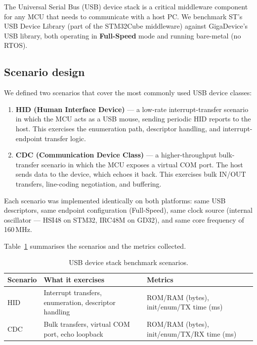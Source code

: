 The Universal Serial Bus (USB) device stack is a critical middleware component for any MCU
that needs to communicate with a host PC. We benchmark ST's USB Device Library (part of the
STM32Cube middleware) against GigaDevice's USB library, both operating in
\textbf{Full-Speed} mode and running bare-metal (no RTOS).

\subsection{Scenario design}
\label{sec:gd32-usb-scenarios}

We defined two scenarios that cover the most commonly used USB device classes:

\begin{enumerate}
  \item \textbf{HID (Human Interface Device)} --- a low-rate interrupt-transfer scenario in
    which the MCU acts as a USB mouse, sending periodic HID reports to the host. This
    exercises the enumeration path, descriptor handling, and interrupt-endpoint transfer
    logic.
  \item \textbf{CDC (Communication Device Class)} --- a higher-throughput bulk-transfer
    scenario in which the MCU exposes a virtual COM port. The host sends data to the
    device, which echoes it back. This exercises bulk IN/OUT transfers, line-coding
    negotiation, and buffering.
\end{enumerate}

Each scenario was implemented identically on both platforms: same USB descriptors, same
endpoint configuration (Full-Speed), same clock source (internal oscillator ---
HSI48 on STM32, IRC48M on GD32), and same core frequency of 160\,MHz.

Table~\ref{tab:gd32-usb-scenarios} summarises the scenarios and the metrics collected.

\begin{table}[H]
  \centering
  \caption{USB device stack benchmark scenarios.}
  \label{tab:gd32-usb-scenarios}
  \begin{tabularx}{\textwidth}{l X l}
    \toprule
    \textbf{Scenario} & \textbf{What it exercises} & \textbf{Metrics} \\
    \midrule
    HID  & Interrupt transfers, enumeration, descriptor handling
         & ROM/RAM (bytes), init/enum/TX time (ms) \\
    CDC  & Bulk transfers, virtual COM port, echo loopback
         & ROM/RAM (bytes), init/enum/TX/RX time (ms) \\
    \bottomrule
  \end{tabularx}
\end{table}

